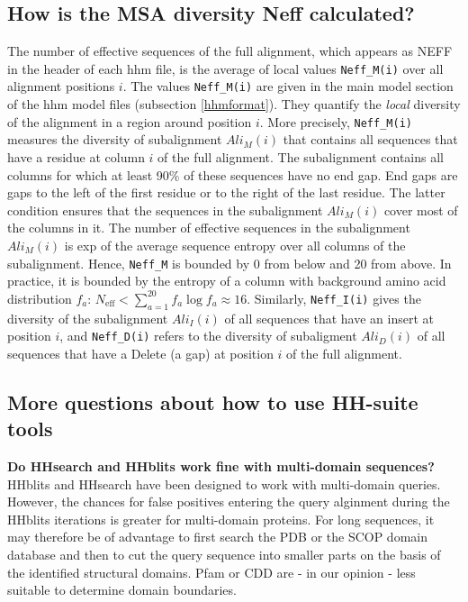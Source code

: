 \documentclass[11pt,a4paper]{article}
\begin{document}
\subsection{How is the MSA diversity Neff calculated?} \label{Neff}
The number of effective sequences of the full alignment, which appears as NEFF in the header of each hhm file, is the average of local values \verb`Neff_M(i)` over all alignment positions $i$. The values \verb`Neff_M(i)` are given in the main model section of the hhm model files (subsection \ref{hhmformat}). They quantify the \emph{local} diversity of the alignment in a region around position $i$. More precisely, \verb`Neff_M(i)` measures the diversity of subalignment $Ali_M(i)$ that contains all sequences that have a residue at column $i$ of the full alignment. The subalignment contains all columns for which at least 90\% of these sequences have no end gap. End gaps are gaps to the left of the first residue or to the right of the last residue. The latter condition ensures that the sequences in the subalignment $Ali_M(i)$ cover most of the columns in it. The number of effective sequences in the subalignment $Ali_M(i)$ is exp of the average sequence entropy over all columns of the subalignment. Hence, \verb`Neff_M` is bounded by 0 from below and 20 from above. In practice, it is bounded by the entropy of a column with background amino acid distribution $f_a$: $N_\mathrm{eff} < \sum_{a=1}^{20} f_a \log f_a \approx 16$. Similarly, \verb`Neff_I(i)` gives the diversity of the subalignment $Ali_I(i)$ of all sequences that have an insert at position $i$, and \verb`Neff_D(i)` refers to the diversity of subaligment $Ali_D(i)$ of all sequences that have a Delete (a gap) at position $i$ of the full alignment. 



\subsection{More questions about how to use HH-suite tools}

{\bf Do HHsearch and HHblits work fine with multi-domain sequences?}
HHblits and HHsearch have been designed to work with multi-domain queries. However, the chances for false positives entering the query alginment during the HHblits iterations is greater for multi-domain proteins. For long sequences, it may therefore be of advantage to first search the PDB or the SCOP domain database and then to cut the query sequence into smaller parts on the basis of the identified structural domains. Pfam or CDD are - in our opinion - less suitable to determine domain boundaries.
\end{document}
